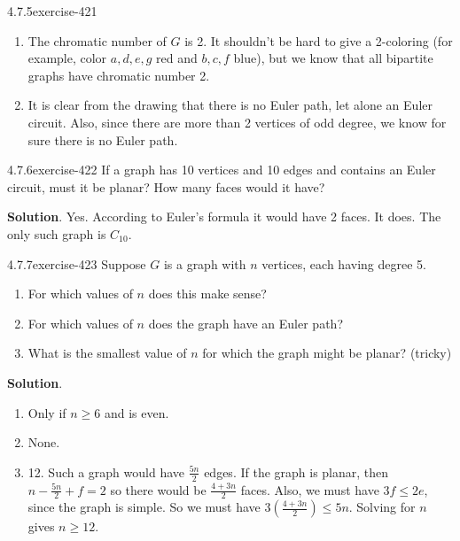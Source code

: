 \documentclass[twoside,11pt,]{book}
\numberwithin{equation}{chapter}
\begin{document}
\begin{divisionsolution}{4.7.5}{}{exercise-421}
\begin{enumerate}[label=(\alph*)]
\item\hypertarget{li-2368}{}\hypertarget{p-4930}{}%
The chromatic number of \(G\) is 2. It shouldn't be hard to give a 2-coloring (for example, color \(a, d, e, g\) red and \(b, c, f\) blue), but we know that all bipartite graphs have chromatic number 2.%
\item\hypertarget{li-2369}{}\hypertarget{p-4931}{}%
It is clear from the drawing that there is no Euler path, let alone an Euler circuit. Also, since there are more than 2 vertices of odd degree, we know for sure there is no Euler path.%
\end{enumerate}
%
\end{divisionsolution}%
\begin{divisionsolution}{4.7.6}{}{exercise-422}%
\hypertarget{p-4932}{}%
If a graph has 10 vertices and 10 edges and contains an Euler circuit, must it be planar? How many faces would it have?%
\par\smallskip%
\noindent\textbf{Solution}.\quad%
\hypertarget{p-4933}{}%
Yes. According to Euler's formula it would have 2 faces. It does. The only such graph is \(C_{10}\).%
\end{divisionsolution}%
\begin{divisionsolution}{4.7.7}{}{exercise-423}%
\hypertarget{p-4934}{}%
Suppose \(G\) is a graph with \(n\) vertices, each having degree 5.\leavevmode%
\begin{enumerate}[label=(\alph*)]
\item\hypertarget{li-2370}{}\hypertarget{p-4935}{}%
For which values of \(n\) does this make sense?%
\item\hypertarget{li-2371}{}\hypertarget{p-4936}{}%
For which values of \(n\) does the graph have an Euler path?%
\item\hypertarget{li-2372}{}\hypertarget{p-4937}{}%
What is the smallest value of \(n\) for which the graph might be planar? (tricky)%
\end{enumerate}
%
\par\smallskip%
\noindent\textbf{Solution}.\quad%
\hypertarget{p-4938}{}%
\leavevmode%
\begin{enumerate}[label=(\alph*)]
\item\hypertarget{li-2373}{}\hypertarget{p-4939}{}%
Only if \(n \ge 6\) and is even.%
\item\hypertarget{li-2374}{}\hypertarget{p-4940}{}%
None.%
\item\hypertarget{li-2375}{}\hypertarget{p-4941}{}%
12. Such a graph would have \(\frac{5n}{2}\) edges. If the graph is planar, then \(n - \frac{5n}{2} + f = 2\) so there would be \(\frac{4+3n}{2}\) faces. Also, we must have \(3f \le 2e\), since the graph is simple. So we must have \(3\left(\frac{4 + 3n}{2}\right) \le 5n\). Solving for \(n\) gives \(n \ge 12\).%
\end{enumerate}
%
\end{divisionsolution}%
\end{document}
